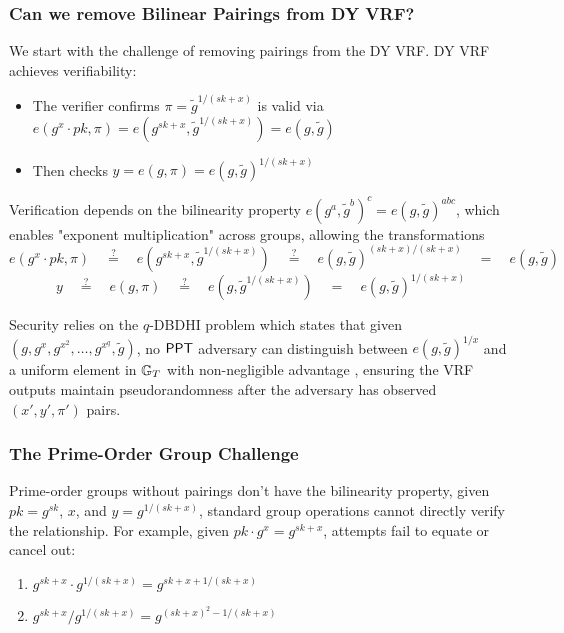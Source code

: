 \subsubsection{Can we remove Bilinear Pairings from DY VRF?}

We start with the challenge of removing pairings from the DY VRF. DY VRF achieves verifiability:

\begin{itemize}
    \item The verifier confirms $\pi = \tilde{g}^{1/(sk+x)}$ is valid via $e(g^x \cdot pk, \pi) = e(g^{sk+x}, \tilde{g}^{1/(sk+x)}) = e(g, \tilde{g})$
    \item Then checks $y = e(g, \pi) = e(g, \tilde{g})^{1/(sk+x)}$
\end{itemize}

Verification depends on the bilinearity property $e(g^a, \tilde{g}^b)^c = e(g, \tilde{g})^{abc}$, which enables "exponent multiplication" across groups, allowing the transformations
\[
e(g^x \cdot pk, \pi) \quad \stackrel{?}{=} \quad e(g^{sk+x}, \tilde{g}^{1/(sk+x)}) \quad \stackrel{?}{=} \quad 
 e(g, \tilde{g})^{(sk+x)/(sk+x)} \quad  \stackrel{}{=} \quad e(g, \tilde{g})
\]
\[
y \quad \stackrel{?}{=} \quad e(g, \pi) \quad \stackrel{?}{=} \quad e(g,\tilde{g}^{1/(sk+x)}) \quad \stackrel{}{=} \quad e(g, \tilde{g})^{1/(sk+x)}
\]

Security relies on the $q$-DBDHI problem which states that given $(g, g^x, g^{x^2}, \ldots, g^{x^q}, \tilde{g})$, no $\mathsf{PPT}$ adversary can distinguish between $e(g,\tilde{g})^{1/x}$ and a uniform element in $\mathbb{G}_T$ with non-negligible advantage , ensuring the VRF outputs maintain pseudorandomness after the adversary has observed $(x',y',\pi')$ pairs.

\subsubsection{The Prime-Order Group Challenge}

Prime-order groups without pairings don't have the bilinearity property, given $pk = g^{sk}$, $x$, and $y = g^{1/(sk+x)}$, standard group operations cannot directly verify the relationship. For example, given $pk  \cdot g^x = g^{sk+x}$, attempts fail to equate or cancel out:

\begin{enumerate}
    \item $g^{sk+x} \cdot g^{1/(sk+x)} = g^{sk+x+1/(sk+x)}$
    \item $g^{sk+x}/g^{1/(sk+x)} = g^{(sk+x)^2-1/(sk+x)}$
\end{enumerate}

